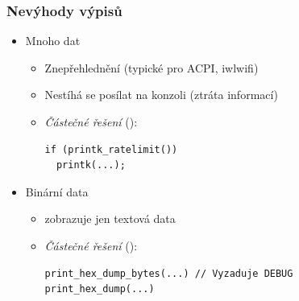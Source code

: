 \begin{frame}[fragile]
  \frametitle{Nevýhody výpisů}

  \begin{itemize}
    \item Mnoho dat
    \begin{itemize}
      \item Znepřehlednění (typické pro ACPI, iwlwifi)
      \item Nestíhá se posílat na konzoli (ztráta informací)

      \pause

      \item \emph{Částečné řešení} ():
      \begin{lstlisting}
if (printk_ratelimit())
  printk(...);
      \end{lstlisting}
    \end{itemize}

    \pause

    \item Binární data
    \begin{itemize}
      \item {} zobrazuje jen textová data

      \pause

      \item \emph{Částečné řešení} ():
      \begin{lstlisting}
print_hex_dump_bytes(...) // Vyzaduje DEBUG
print_hex_dump(...)
      \end{lstlisting}
    \end{itemize}
  \end{itemize}

  \pause

  \begin{center}
  \end{center}

\end{frame}


